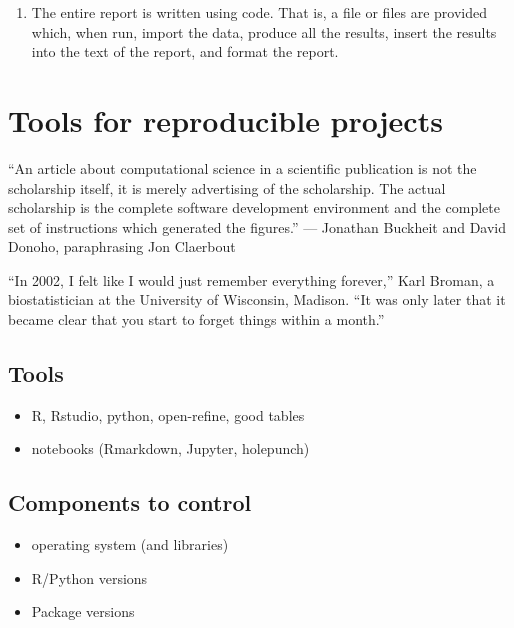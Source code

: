 \documentclass[
]{book}
\providecommand{\tightlist}{%
  \setlength{\itemsep}{0pt}\setlength{\parskip}{0pt}}
\begin{document}
\begin{enumerate}
\def\labelenumi{\alph{enumi})}
\setcounter{enumi}{5}
\tightlist
\item
  The entire report is written using code. That is, a file or files are provided which, when run, import the data, produce all the results, insert the results into the text of the report, and format the report.
\end{enumerate}

\hypertarget{tools-for-reproducible-projects}{%
\chapter{Tools for reproducible projects}\label{tools-for-reproducible-projects}}

``An article about computational science in a scientific publication is not the scholarship itself,
it is merely advertising of the scholarship. The
actual scholarship is the complete software development environment and the complete set
of instructions which generated the figures.''
--- Jonathan Buckheit and David Donoho,
paraphrasing Jon Claerbout

``In 2002, I felt like I would just remember everything forever,'' Karl Broman, a biostatistician at the University of Wisconsin, Madison. ``It was only later that it became clear that you start to forget things within a month.''

\hypertarget{tools}{%
\section{Tools}\label{tools}}

\begin{itemize}
\tightlist
\item
  R, Rstudio, python, open-refine, good tables
\item
  notebooks (Rmarkdown, Jupyter, holepunch)
\end{itemize}

\hypertarget{components-to-control}{%
\section{Components to control}\label{components-to-control}}

\begin{itemize}
\tightlist
\item
  operating system (and libraries)
\item
  R/Python versions
\item
  Package versions
\end{itemize}
\end{document}
